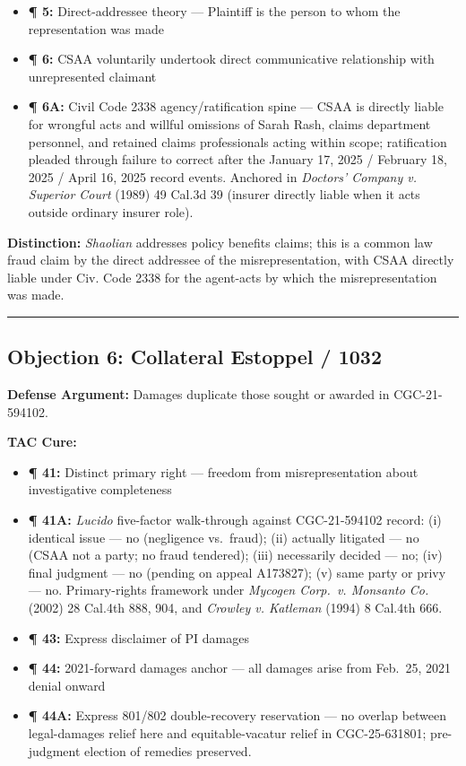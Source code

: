 \begin{itemize}
\tightlist
\item
  \textbf{¶ 5:} Direct-addressee theory --- Plaintiff is the person to whom the representation was made
\item
  \textbf{¶ 6:} CSAA voluntarily undertook direct communicative relationship with unrepresented claimant
\item
  \textbf{¶ 6A:} Civil Code \textsection{} 2338 agency/ratification spine --- CSAA is directly liable for wrongful acts and willful omissions of Sarah Rash, claims department personnel, and retained claims professionals acting within scope; ratification pleaded through failure to correct after the January 17, 2025 / February 18, 2025 / April 16, 2025 record events. Anchored in \emph{Doctors' Company v. Superior Court} (1989) 49 Cal.3d 39 (insurer directly liable when it acts outside ordinary insurer role).
\end{itemize}

\textbf{Distinction:} \emph{Shaolian} addresses policy benefits claims; this is a common law fraud claim by the direct addressee of the misrepresentation, with CSAA directly liable under Civ. Code \textsection{} 2338 for the agent-acts by which the misrepresentation was made.

\begin{center}\rule{0.5\linewidth}{0.5pt}\end{center}

\subsection{Objection 6: Collateral Estoppel / \textsection{} 1032}\label{objection-6-collateral-estoppel-1032}

\textbf{Defense Argument:} Damages duplicate those sought or awarded in CGC-21-594102.

\textbf{TAC Cure:}

\begin{itemize}
\tightlist
\item
  \textbf{¶ 41:} Distinct primary right --- freedom from misrepresentation about investigative completeness
\item
  \textbf{¶ 41A:} \emph{Lucido} five-factor walk-through against CGC-21-594102 record: (i) identical issue --- no (negligence vs.~fraud); (ii) actually litigated --- no (CSAA not a party; no fraud tendered); (iii) necessarily decided --- no; (iv) final judgment --- no (pending on appeal A173827); (v) same party or privy --- no. Primary-rights framework under \emph{Mycogen Corp.~v. Monsanto Co.} (2002) 28 Cal.4th 888, 904, and \emph{Crowley v. Katleman} (1994) 8 Cal.4th 666.
\item
  \textbf{¶ 43:} Express disclaimer of PI damages
\item
  \textbf{¶ 44:} 2021-forward damages anchor --- all damages arise from Feb.~25, 2021 denial onward
\item
  \textbf{¶ 44A:} Express 801/802 double-recovery reservation --- no overlap between legal-damages relief here and equitable-vacatur relief in CGC-25-631801; pre-judgment election of remedies preserved.
\end{itemize}

